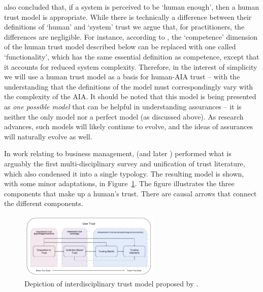         \citet{Tripp2011-rx} also concluded that, if a system is perceived to be `human enough', then a human trust model is appropriate. While there is technically a difference between their definitions of `human' and `system' trust we argue that, for practitioners, the differences are negligible. For instance, according to \cite{Tripp2011-rx}, the `competence' dimension of the human trust model described below can be replaced with one called `functionality', which has the same essential definition as competence, except that it accounts for reduced system complexity. Therefore, in the interest of simplicity we will use a human trust model as a basis for human-AIA trust -- with the understanding that the definitions of the model must correspondingly vary with the complexity of the AIA. It should be noted that this model is being presented as \emph{one possible model} that can be helpful in understanding assurances -- it is neither the only model nor a perfect model (as discussed above). As research advances, such models will likely continue to evolve, and the ideas of assurances will naturally evolve as well.

        In work relating to business management, \citet{McKnight1998-ty} (and later \cite{McKnight2001-fa}) performed what is arguably the first multi-disciplinary survey and unification of trust literature, which also condensed it into a single typology. The resulting model is shown, with some minor adaptations, in Figure~\ref{fig:UserTrust}. The figure illustrates the three components that make up a human's trust. There are causal arrows that connect the different components.

        \begin{figure}[htbp]
            \centering
            \includegraphics[width=0.6\textwidth]{Figures/UserTrust}
            \caption{Depiction of interdisciplinary trust model proposed by \citet{McKnight2001-fa}.}
            \label{fig:UserTrust}
        \end{figure}

